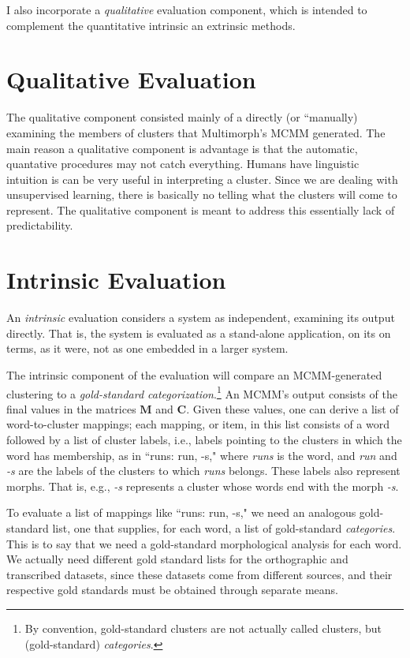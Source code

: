 I also incorporate a \emph{qualitative} evaluation component, which is intended to complement the quantitative intrinsic an extrinsic methods.


\section{Qualitative Evaluation}
The qualitative component consisted mainly of a directly (or ``manually) examining the members of clusters that Multimorph's MCMM generated. 
The main reason a qualitative component is advantage is that the automatic, quantative procedures may not catch everything. Humans have linguistic intuition is can be very useful in interpreting a cluster. Since we are dealing with unsupervised learning, there is basically no telling what the clusters will come to represent. The qualitative component is meant to address this essentially lack of predictability.

\section{Intrinsic Evaluation}
An \emph{intrinsic} evaluation considers a system as independent, examining its 
output directly. That is, the system is evaluated as a stand-alone application, on its
on terms, as it were,
not as one embedded in a larger system.

The intrinsic component of the evaluation will compare an MCMM-generated clustering to a 
\emph{gold-standard categorization}.\footnote{By convention, 
gold-standard clusters are not actually called clusters, 
but (gold-standard) \emph{categories}.} 
An MCMM's output consists of 
the final values in the matrices $\mathbf{M}$ and $\mathbf{C}$.
Given these values, one can derive a list of word-to-cluster mappings; 
each mapping, or item, in this list
consists of a word followed by a list of cluster labels, i.e., labels pointing to
the clusters in which the word has membership, 
as in ``runs: run, -s,"  where \textit{runs} is the word, and \textit{run} and \textit{-s} 
are the labels of the clusters to which \textit{runs} belongs. These labels also represent 
morphs. That is, e.g., \emph{-s} represents a cluster whose words end with the morph 
\emph{-s}.

To evaluate a list of mappings like ``runs: run, -s," we need an analogous 
gold-standard list, one that supplies, for each word, a list of gold-standard \emph{categories}.
This is to say that we need a gold-standard morphological analysis for each word. 
We actually need different gold standard lists for the orthographic and transcribed datasets, 
since these datasets come from different sources, and their respective gold standards must 
be obtained through separate means.

